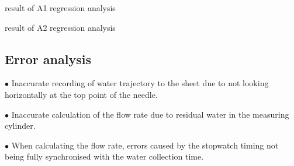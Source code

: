\begin{minipage}{\textwidth}
    \centering
\begin{minipage}[t]{0.49\textwidth}
    \makeatletter{}
    \centering
    \caption{result of A1 regression analysis}
    \label{table4} 
\end{minipage}
\begin{minipage}[t]{0.49\textwidth}
    \makeatletter{}
    \centering
    \caption{result of A2 regression analysis}
    \label{table5} 
\end{minipage}
\end{minipage}



\subsection{Error analysis}

$\bullet$ Inaccurate recording of water trajectory to the sheet 
due to not looking horizontally at the top point of the needle.

$\bullet$ Inaccurate calculation of the flow rate due to residual 
water in the measuring cylinder.

$\bullet$ When calculating the flow rate, errors caused by the stopwatch timing not being fully 
synchronised with the water collection time.

\FloatBarrier